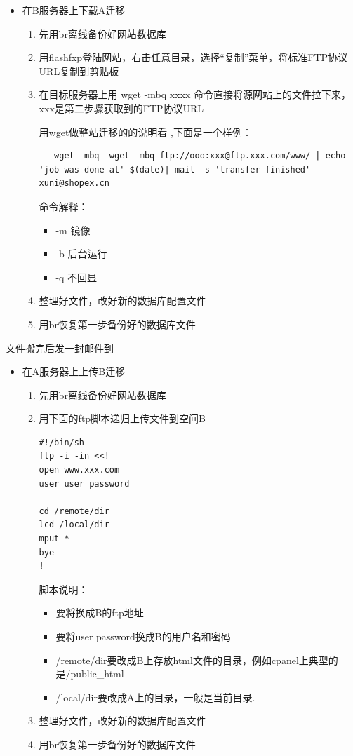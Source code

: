 \documentclass{article}
\begin{document}
\begin{itemize}
\item 在B服务器上下载A迁移

 \begin{enumerate}
 \item 先用br离线备份好网站数据库
 \item 用flashfxp登陆网站，右击任意目录，选择“复制”菜单，将标准FTP协议URL复制到剪贴板
 \item 在目标服务器上用 wget -mbq xxxx 命令直接将源网站上的文件拉下来，xxx是第二步骤获取到的FTP协议URL

   用wget做整站迁移的的说明看 ,下面是一个样例：
\begin{verbatim}
   wget -mbq  wget -mbq ftp://ooo:xxx@ftp.xxx.com/www/ | echo 'job was done at' $(date)| mail -s 'transfer finished' xuni@shopex.cn 
\end{verbatim}
   命令解释：

    \begin{itemize}
    \item -m    镜像
    \item -b    后台运行
    \item -q    不回显

    \end{itemize}
 \item 整理好文件，改好新的数据库配置文件
 \item 用br恢复第一步备份好的数据库文件
 \end{enumerate}
\end{itemize}

文件搬完后发一封邮件到

\begin{itemize}
\item 在A服务器上上传B迁移

 \begin{enumerate}
 \item 先用br离线备份好网站数据库
 \item 用下面的ftp脚本递归上传文件到空间B
\begin{verbatim}
#!/bin/sh
ftp -i -in <<!
open www.xxx.com
user user password
 
cd /remote/dir
lcd /local/dir
mput *
bye
!
\end{verbatim}
  脚本说明：
  \begin{itemize}
  \item 要将换成B的ftp地址
  \item 要将user password换成B的用户名和密码
  \item /remote/dir要改成B上存放html文件的目录，例如cpanel上典型的是/public\_html
  \item /local/dir要改成A上的目录，一般是当前目录.
  \end{itemize}
 \item 整理好文件，改好新的数据库配置文件
 \item 用br恢复第一步备份好的数据库文件
 \end{enumerate}
\end{itemize}
\end{document}

